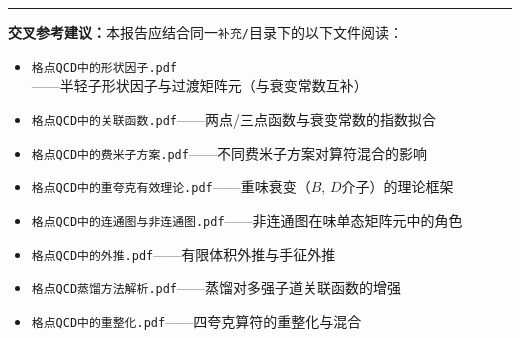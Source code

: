 \documentclass[12pt,a4paper]{ctexart}
\theoremstyle{definition}
\begin{document}
\vspace{0.5cm}
\noindent\rule{\textwidth}{0.5pt}
\small
\textbf{交叉参考建议：}本报告应结合同一\texttt{补充/}目录下的以下文件阅读：
\begin{itemize}[nosep]
    \item \texttt{格点QCD中的形状因子.pdf}——半轻子形状因子与过渡矩阵元（与衰变常数互补）
    \item \texttt{格点QCD中的关联函数.pdf}——两点/三点函数与衰变常数的指数拟合
    \item \texttt{格点QCD中的费米子方案.pdf}——不同费米子方案对算符混合的影响
    \item \texttt{格点QCD中的重夸克有效理论.pdf}——重味衰变（$B$, $D$介子）的理论框架
    \item \texttt{格点QCD中的连通图与非连通图.pdf}——非连通图在味单态矩阵元中的角色
    \item \texttt{格点QCD中的外推.pdf}——有限体积外推与手征外推
    \item \texttt{格点QCD蒸馏方法解析.pdf}——蒸馏对多强子道关联函数的增强
    \item \texttt{格点QCD中的重整化.pdf}——四夸克算符的重整化与混合
\end{itemize}
\end{document}
